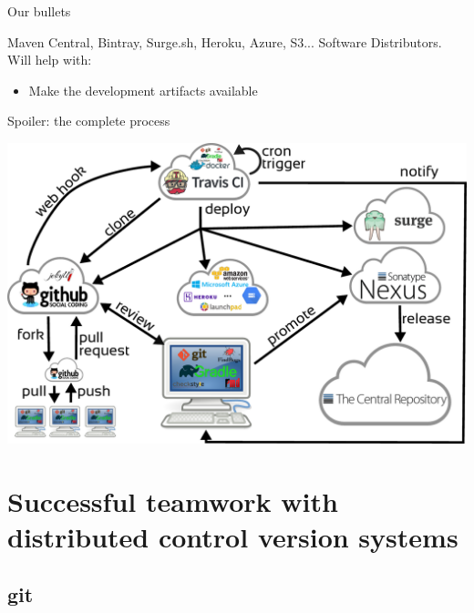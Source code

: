\documentclass[presentation]{beamer}
\begin{document}
\begin{frame}{Our bullets}
\begin{block}{Maven Central, Bintray, Surge.sh, Heroku, Azure, S3...}
		Software Distributors. Will help with:
		\begin{itemize}
			\item Make the development artifacts available
		\end{itemize}
	\end{block}
\end{frame}

\begin{frame}[fragile]{Spoiler: the complete process}
	\begin{center}
		\includegraphics[width=.9\textwidth]{images/ci}
	\end{center}
\end{frame}

\section{Successful teamwork with distributed control version systems}

\subsection{git}
\end{document}
